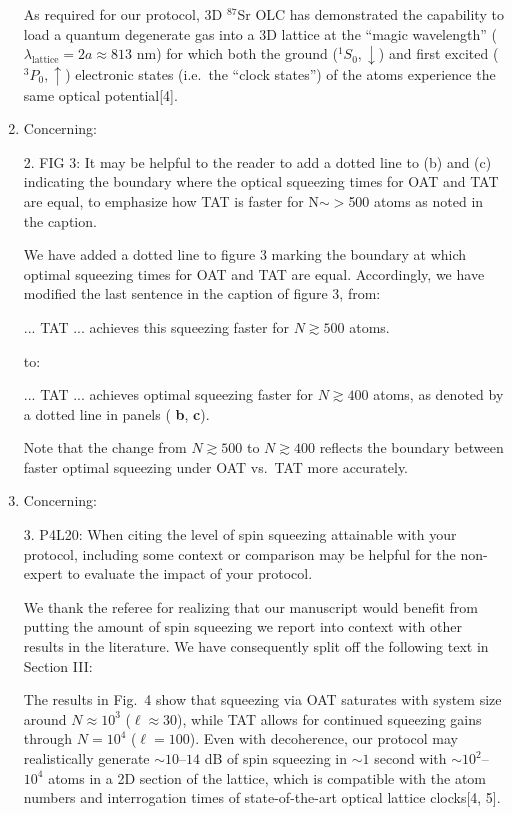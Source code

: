 \documentclass[preprint,superscriptaddress]{revtex4-2}
\renewcommand{\t}{\text} %
\newcommand{\up}{\uparrow}
\newcommand{\dn}{\downarrow}
\newcommand{\blue}[1]{{\color{blue} #1}}
\newcommand{\red}[1]{{\color{red} #1}}
\newcommand{\green}[1]{{\color{ForestGreen} #1}}
\begin{document}
\begin{enumerate}
  \green{As required for our protocol, 3D $^{87}$Sr OLC has
    demonstrated the capability to load a quantum degenerate gas into
    a 3D lattice at the ``magic wavelength''
    ($\lambda_{\t{lattice}}=2a\approx813$ nm) for which both the
    ground ($^1S_0,\dn$) and first excited ($^3P_0,\up$) electronic
    states (i.e.~the ``clock states'') of the atoms experience the
    same optical potential[4].}

\item Concerning:

  \blue{2. FIG 3: It may be helpful to the reader to add a dotted line
    to (b) and (c) indicating the boundary where the optical squeezing
    times for OAT and TAT are equal, to emphasize how TAT is faster
    for N$\sim>$500 atoms as noted in the caption.}

  We have added a dotted line to figure 3 marking the boundary at
  which optimal squeezing times for OAT and TAT are equal.
  Accordingly, we have modified the last sentence in the caption of
  figure 3, from:

  \red{... TAT ... achieves this squeezing faster for $N\gtrsim500$
    atoms.}

  to:

  \green{... TAT ... achieves optimal squeezing faster for
    $N\gtrsim400$ atoms, as denoted by a dotted line in panels ({\bf
      b}, {\bf c}).}

  Note that the change from \red{$N\gtrsim500$} to
  \green{$N\gtrsim400$} reflects the boundary between faster optimal
  squeezing under OAT vs.~TAT more accurately.

\item Concerning:

  \blue{3. P4L20: When citing the level of spin squeezing attainable
    with your protocol, including some context or comparison may be
    helpful for the non-expert to evaluate the impact of your
    protocol.}

  We thank the referee for realizing that our manuscript would benefit
  from putting the amount of spin squeezing we report into context
  with other results in the literature.  We have consequently split
  off the following text in Section III:

  \red{The results in Fig.~4 show that squeezing via OAT saturates
    with system size around $N\approx10^3$ ($\ell\approx30$), while
    TAT allows for continued squeezing gains through $N=10^4$
    ($\ell=100$).  Even with decoherence, our protocol may
    realistically generate $\sim10$--$14$ dB of spin squeezing in
    $\sim1$ second with $\sim10^2$--$10^4$ atoms in a 2D section of
    the lattice, which is compatible with the atom numbers and
    interrogation times of state-of-the-art optical lattice clocks[4,
    5].}


\end{enumerate}
\end{document}
